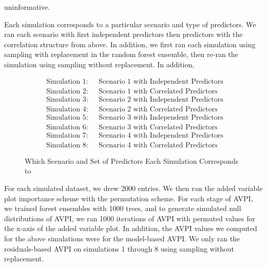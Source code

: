 \documentclass[12pt,twoside]{reedthesis}
\theoremstyle{definition}
\theoremstyle{definition}
\theoremstyle{definition}
\theoremstyle{remark}
\begin{document}
uninformative. \par
\begin{table}

\caption{\label{tab:unnamed-chunk-10}Informative and Uninformative Variables For Each Scenario}
\centering
{}
\end{table}
Each simulation corresponds to a particular scenario and type of
predictors. We ran each scenario with first independent predictors then
predictors with the correlation structure from above. In addition, we
first ran each simulation using sampling with replacement in the random
forest ensemble, then re-ran the simulation using sampling without
replacement. In addition, \par
\begin{figure}[h]
\begin{align}
\text{ Simulation 1: } & \text{ Scenario 1 with Independent Predictors} \nonumber \\
\text{ Simulation 2: } & \text{ Scenario 1 with Correlated Predictors} \nonumber \\
\text{ Simulation 3: } & \text{ Scenario 2 with Independent Predictors} \nonumber \\
\text{ Simulation 4: } & \text{ Scenario 2 with Correlated Predictors} \nonumber \\
\text{ Simulation 5: } & \text{ Scenario 3 with Independent Predictors} \nonumber \\
\text{ Simulation 6: } & \text{ Scenario 3 with Correlated Predictors} \nonumber \\
\text{ Simulation 7: } & \text{ Scenario 4 with Independent Predictors} \nonumber \\
\text{ Simulation 8: } & \text{ Scenario 4 with Correlated Predictors} \nonumber
\end{align}
\caption{Which Scenario and Set of Predictors Each Simulation Corresponds to}
\label{ScenarioPredictors}
\end{figure}
For each simulated dataset, we drew 2000 entries. We then ran the added
variable plot importance scheme with the permutation scheme. For each
stage of AVPI, we trained forest ensembles with 1000 trees, and to
generate simulated null distributions of AVPI, we ran 1000 iterations of
AVPI with permuted values for the x-axis of the added variable plot. In
addition, the AVPI values we computed for the above simulations were for
the model-based AVPI. We only ran the residuals-based AVPI on
simulations 1 through 8 using sampling without replacement. \par
\end{document}
